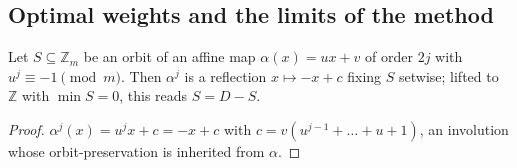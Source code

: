 \documentclass[12pt]{article}
\newcommand{\Z}{\mathbb{Z}}
\begin{document}
\subsection{Optimal weights and the limits of the method}

\begin{lemma}\label{lem:palindromy}
Let $S\subseteq\Z_{m}$ be an orbit of an affine map
$\alpha(x)=ux+v$ of order $2j$ with $u^{j}\equiv-1\pmod m$. Then
$\alpha^{j}$ is a reflection $x\mapsto-x+c$ fixing $S$ setwise; lifted
to $\Z$ with $\min S=0$, this reads $S=D-S$.
\end{lemma}

\begin{proof}
$\alpha^{j}(x)=u^{j}x+c=-x+c$ with
$c=v(u^{j-1}+\dots+u+1)$, an involution whose orbit-preservation is
inherited from $\alpha$.
\end{proof}
\end{document}
